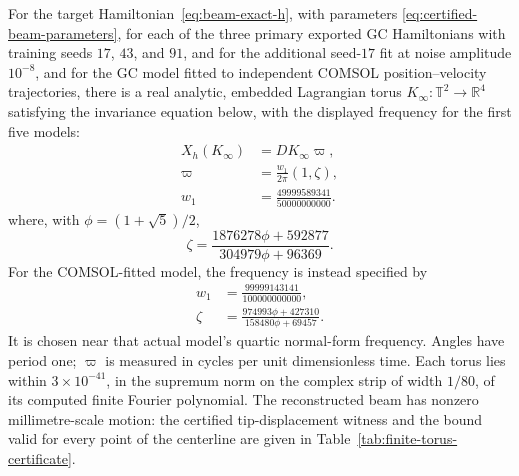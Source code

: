 \begin{theorem}
\label{thm:beam-finite-tori}
For the target Hamiltonian~\eqref{eq:beam-exact-h}, with parameters
\eqref{eq:certified-beam-parameters}, for each of the three primary exported
GC Hamiltonians with training seeds $17$, $43$, and $91$, and for the
additional seed-$17$ fit at noise amplitude $10^{-8}$, and for the
GC model fitted to independent COMSOL position--velocity trajectories,
there is a real
analytic, embedded Lagrangian torus $K_\infty:\mathbb T^2\to\mathbb R^4$
satisfying the invariance equation below, with the displayed frequency
for the first five models:
\begin{equation}
 \begin{aligned}
 X_h(K_\infty)&=DK_\infty\varpi,\\
 \varpi&=\frac{w_1}{2\pi}(1,\zeta),\\
 w_1&=\frac{49999589341}{50000000000}.
 \end{aligned}
 \label{eq:certified-invariance}
\end{equation}
where, with $\phi=(1+\sqrt5)/2$,
\begin{equation}
 \zeta=\frac{1876278\phi+592877}{304979\phi+96369}.
\label{eq:certified-quadratic-frequency}
\end{equation}
For the COMSOL-fitted model, the frequency is instead specified by
\begin{equation}
 \begin{aligned}
 w_1&=\frac{99999143141}{100000000000},\\
 \zeta&=\frac{974993\phi+427310}{158480\phi+69457}.
 \end{aligned}
 \label{eq:certified-comsol-frequency}
\end{equation}
It is chosen near that actual model's quartic normal-form frequency.
Angles have period one; $\varpi$ is measured in cycles per unit
dimensionless time. Each torus lies within $3\times10^{-41}$, in the
supremum norm on the complex strip of width $1/80$, of its computed
finite Fourier polynomial. The reconstructed beam has nonzero
millimetre-scale motion: the certified tip-displacement witness and the
bound valid for every point of the centerline are given in
Table~\ref{tab:finite-torus-certificate}.
\end{theorem}

